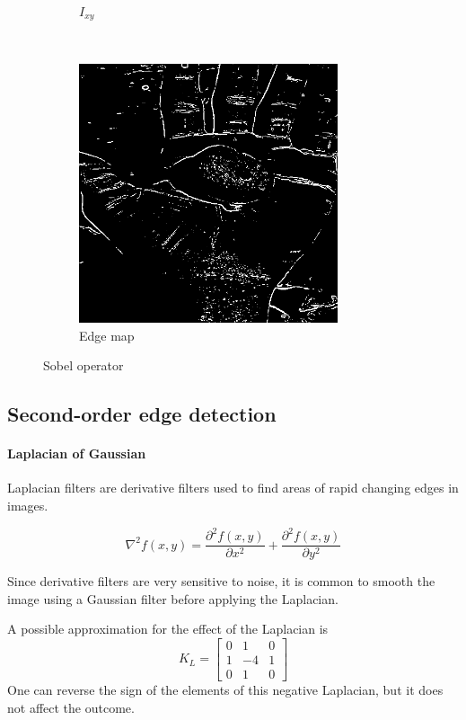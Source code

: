 \documentclass[12pt]{article}
\begin{document}
\begin{figure}[ht!]
\begin{subfigure}[t]{0.5\textwidth}
        \caption{$I_{xy}$}
    \end{subfigure}%
    ~
    \begin{subfigure}[t]{0.5\textwidth}
        \centering
        \includegraphics[height=3in]{images/sobel_edge}
        \caption{Edge map}
    \end{subfigure}
    \caption{Sobel operator}
\end{figure}

\subsection*{Second-order edge detection}
\paragraph*{Laplacian of Gaussian}
Laplacian filters are derivative filters used to find areas of rapid changing edges in images.

\begin{equation}
	\nabla^2 f(x, y) = \frac{\partial^2 f(x, y)}{\partial x^2} + \frac{\partial^2 f(x, y)}{\partial y^2}
\end{equation}

Since derivative filters are very sensitive to noise, it is common to smooth the image using a Gaussian filter before applying the Laplacian.

A possible approximation for the effect of the Laplacian is 
\begin{equation}
	K_L = \begin{bmatrix}
		0 & 1 & 0 \\ 1 & -4 & 1 \\ 0 & 1 & 0
	\end{bmatrix}
\end{equation}
One can reverse the sign of the elements of this negative Laplacian, but it does not affect the outcome.
\end{document}
